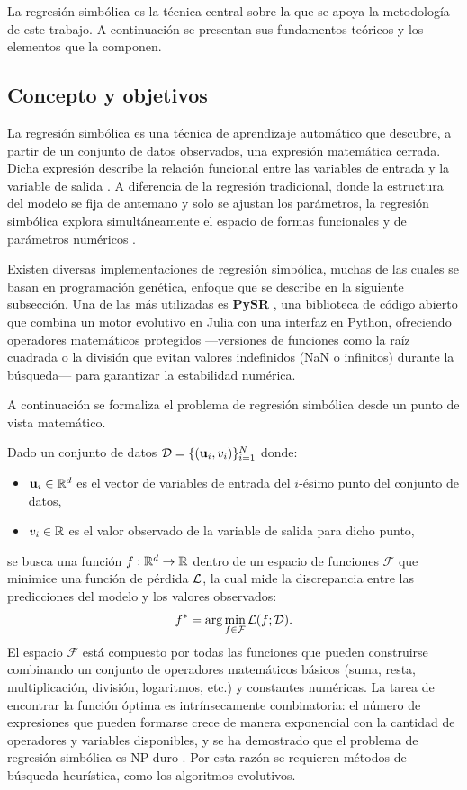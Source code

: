 La regresión simbólica es la técnica central sobre la que se apoya la metodología de este trabajo. A continuación se presentan sus fundamentos teóricos y los elementos que la componen.

\subsection{Concepto y objetivos}

La regresión simbólica es una técnica de aprendizaje automático que descubre, a partir de un conjunto de datos observados, una expresión matemática cerrada. Dicha expresión describe la relación funcional entre las variables de entrada y la variable de salida \cite{koza1992genetic}. A diferencia de la regresión tradicional, donde la estructura del modelo se fija de antemano y solo se ajustan los parámetros, la regresión simbólica explora simultáneamente el espacio de formas funcionales y de parámetros numéricos \cite{schmidt2009distilling}.

Existen diversas implementaciones de regresión simbólica, muchas de las cuales se basan en programación genética, enfoque que se describe en la siguiente subsección. Una de las más utilizadas es \textbf{PySR} \cite{cranmer2023pysr}, una biblioteca de código abierto que combina un motor evolutivo en Julia con una interfaz en Python, ofreciendo operadores matemáticos protegidos ---versiones de funciones como la raíz cuadrada o la división que evitan valores indefinidos (NaN o infinitos) durante la búsqueda--- para garantizar la estabilidad numérica.

A continuación se formaliza el problema de regresión simbólica desde un punto de vista matemático.

Dado un conjunto de datos \(\mathcal{D} = \{(\mathbf{u}_i, v_i)\}_{i=1}^{N}\) donde: \begin{itemize} \item \(\mathbf{u}_i \in \mathbb{R}^d\) es el vector de variables de entrada del \(i\)-ésimo punto del conjunto de datos, \item \(v_i \in \mathbb{R}\) es el valor observado de la variable de salida para dicho punto, \end{itemize} se busca una función \(f: \mathbb{R}^d \to \mathbb{R}\) dentro de un espacio de funciones \(\mathcal{F}\) que minimice una función de pérdida \(\mathcal{L}\), la cual mide la discrepancia entre las predicciones del modelo y los valores observados: \begin{equation} f^* = \arg\min_{f \in \mathcal{F}} \mathcal{L}(f; \mathcal{D}). \end{equation} El espacio \(\mathcal{F}\) está compuesto por todas las funciones que pueden construirse combinando un conjunto de operadores matemáticos básicos (suma, resta, multiplicación, división, logaritmos, etc.) y constantes numéricas. La tarea de encontrar la función óptima es intrínsecamente combinatoria: el número de expresiones que pueden formarse crece de manera exponencial con la cantidad de operadores y variables disponibles, y se ha demostrado que el problema de regresión simbólica es NP-duro \cite{virgolin2022np}. Por esta razón se requieren métodos de búsqueda heurística, como los algoritmos evolutivos.

